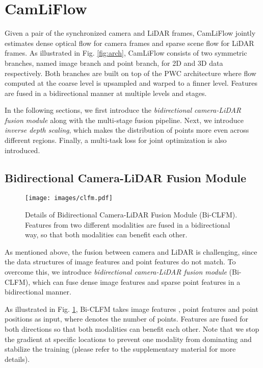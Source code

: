 \documentclass[10pt,twocolumn,letterpaper]{article}
\begin{document}
\section{CamLiFlow}

Given a pair of the synchronized camera and LiDAR frames, CamLiFlow jointly estimates dense optical flow for camera frames and sparse scene flow for LiDAR frames. As illustrated in Fig. \ref{fig:arch}, CamLiFlow consists of two symmetric branches, named image branch and point branch, for 2D and 3D data respectively. Both branches are built on top of the PWC architecture \cite{sun2018pwc, wu2019pointpwc} where flow computed at the coarse level is upsampled and warped to a finner level. Features are fused in a bidirectional manner at multiple levels and stages.

In the following sections, we first introduce the \textit{bidirectional camera-LiDAR fusion module} along with the multi-stage fusion pipeline. Next, we introduce \textit{inverse depth scaling}, which makes the distribution of points more even across different regions. Finally, a multi-task loss for joint optimization is also introduced.

\subsection{Bidirectional Camera-LiDAR Fusion Module}

\begin{figure}[t]
    \centering
    \texttt{[image: images/clfm.pdf]}
    \vspace{-18pt}
    \caption{Details of Bidirectional Camera-LiDAR Fusion Module (Bi-CLFM). Features from two different modalities are fused in a bidirectional way, so that both modalities can benefit each other.}
    \vspace{-15pt}
    \label{fig:clfm}
\end{figure}

As mentioned above, the fusion between camera and LiDAR is challenging, since the data structures of image features and point features do not match. To overcome this, we introduce \textit{bidirectional camera-LiDAR fusion module} (Bi-CLFM), which can fuse dense image features and sparse point features in a bidirectional manner. 

As illustrated in Fig. \ref{fig:clfm}, Bi-CLFM takes image features , point features  and point positions  as input, where  denotes the number of points. Features are fused for both directions so that both modalities can benefit each other. Note that we stop the gradient at specific locations to prevent one modality from dominating and stabilize the training (please refer to the supplementary material for more details).
\end{document}
